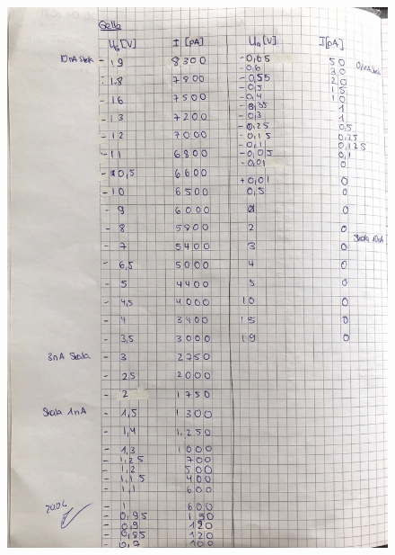 \begin{figure}
    \centering
    \includegraphics[width=\textwidth]{content/photogelb.pdf}
\end{figure}

    
